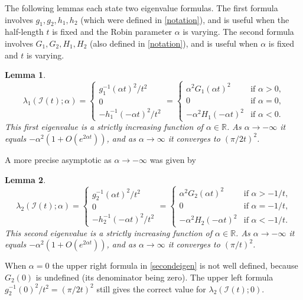 \documentclass[12pt,reqno]{amsart}
\newtheorem{lemma}[lemma]{Lemma}
\theoremstyle{definition}
\newcommand{\go}{G_1}
\newcommand{\gt}{G_2}
\newcommand{\ho}{H_1}
\newcommand{\htwo}{H_2}
\newcommand{\R}{{\mathbb R}}
\begin{document}
The following lemmas each state two eigenvalue formulas. The first formula involves $g_1,g_2,h_1,h_2$ (which were defined in \autoref{notation}), and is useful when the half-length $t$ is fixed and the Robin parameter $\alpha$ is varying. The second formula involves $\go,\gt,\ho,\htwo$ (also defined in \autoref{notation}), and is useful when $\alpha$ is fixed and $t$ is varying. 
%
\begin{lemma} \label{firsteigen}
\[
\lambda_1(\mathcal{I}(t);\alpha) = 
\begin{cases}
g_1^{-1}(\alpha t)^2/t^2 \\
0 \\
-h_1^{-1}(-\alpha t)^2/t^2 
\end{cases}
=
\begin{cases}
\alpha^2 \go(\alpha t)^2 & \text{if $\alpha>0$,} \\
0 & \text{if $\alpha=0$,} \\
-\alpha^2 \ho(-\alpha t)^2 & \text{if $\alpha<0$.}
\end{cases}
\]
This first eigenvalue is a strictly increasing function of $\alpha \in \R$. As $\alpha \to -\infty$ it equals $-\alpha^2 \left(1+O(e^{2\alpha t}) \right)$, and as $\alpha \to \infty$ it converges to $(\pi/2t)^2$.
\end{lemma}
%
\noindent A more precise asymptotic as $\alpha \to -\infty$ was given by 
%
\begin{lemma} \label{secondeigen}
\[
\lambda_2(\mathcal{I}(t);\alpha) = 
\begin{cases}
g_2^{-1}(\alpha t)^2/t^2 \\
0 \\
-h_2^{-1}(-\alpha t)^2/t^2 
\end{cases}
=
\begin{cases}
\alpha^2 \gt(\alpha t)^2 & \text{if $\alpha> -1/t$,} \\
0 & \text{if $\alpha= -1/t$,} \\
-\alpha^2 \htwo(-\alpha t)^2 & \text{if $\alpha< -1/t$.}
\end{cases}
\]
This second eigenvalue is a strictly increasing function of $\alpha \in \R$. As $\alpha \to -\infty$ it equals $-\alpha^2 \left(1+ O(e^{2\alpha t}) \right)$, and as $\alpha \to \infty$ it converges to $(\pi/t)^2$.
\end{lemma}
%
When $\alpha=0$ the upper right formula in \autoref{secondeigen} is not well defined, because $\gt(0)$ is undefined (its denominator being zero). The upper left formula $g_2^{-1}(0)^2/t^2=(\pi/2t)^2$ still gives the correct value for $\lambda_2(\mathcal{I}(t);0)$.  
\end{document}
